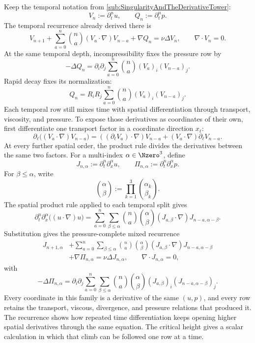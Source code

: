 Keep the temporal notation from \cref{sub:SingularityAndTheDerivativeTower}:
\[
  V_n
  :=
  \partial_t^nu,
  \qquad
  Q_n
  :=
  \partial_t^np.
\]
The temporal recurrence already derived there is
\[
  V_{n+1}
  +
  \sum_{a=0}^{n}
  \binom{n}{a}
  (V_a\cdot\nabla)V_{n-a}
  +\nabla Q_n
  =
  \nu\Delta V_n,
  \qquad
  \nabla\cdot V_n=0.
\]
At the same temporal depth, incompressibility fixes the pressure row by
\[
  -\Delta Q_n
  =
  \partial_i\partial_j
  \sum_{a=0}^{n}
  \binom{n}{a}
  (V_a)_i(V_{n-a})_j.
\]
Rapid decay fixes its normalization:
\[
  Q_n
  =
  R_iR_j
  \sum_{a=0}^{n}
  \binom{n}{a}
  (V_a)_i(V_{n-a})_j.
\]
Each temporal row still mixes time with spatial differentiation through transport, viscosity, and pressure.
To expose those derivatives as coordinates of their own, first differentiate one transport factor in a coordinate direction \(x_\ell\):
\[
  \partial_\ell\bigl((V_a\cdot\nabla)V_{n-a}\bigr)
  =
  ((\partial_\ell V_a)\cdot\nabla)V_{n-a}
  +
  (V_a\cdot\nabla)\partial_\ell V_{n-a}.
\]
At every further spatial order, the product rule divides the derivatives between the same two factors.
For a multi-index \(\alpha\in\Nzero^3\), define
\[
  J_{n,\alpha}
  :=
  \partial_t^n\partial_x^\alpha u,
  \qquad
  \Pi_{n,\alpha}
  :=
  \partial_t^n\partial_x^\alpha p.
\]
For \(\beta\leq\alpha\), write
\[
  \binom{\alpha}{\beta}
  :=
  \prod_{k=1}^{3}
  \binom{\alpha_k}{\beta_k}.
\]
The spatial product rule applied to each temporal split gives
\[
  \partial_t^n\partial_x^\alpha
  \bigl((u\cdot\nabla)u\bigr)
  =
  \sum_{a=0}^{n}
  \sum_{\beta\leq\alpha}
  \binom{n}{a}
  \binom{\alpha}{\beta}
  (J_{a,\beta}\cdot\nabla)
  J_{n-a,\alpha-\beta}.
\]
Substitution gives the pressure-complete mixed recurrence
\begin{align*}
  J_{n+1,\alpha}
  &+
  \sum_{a=0}^{n}
  \sum_{\beta\leq\alpha}
  \binom{n}{a}
  \binom{\alpha}{\beta}
  (J_{a,\beta}\cdot\nabla)
  J_{n-a,\alpha-\beta}
  \\
  &+
  \nabla\Pi_{n,\alpha}
  =
  \nu\Delta J_{n,\alpha},
  \qquad
  \nabla\cdot J_{n,\alpha}=0,
\end{align*}
with
\[
  -\Delta\Pi_{n,\alpha}
  =
  \partial_i\partial_j
  \sum_{a=0}^{n}
  \sum_{\beta\leq\alpha}
  \binom{n}{a}
  \binom{\alpha}{\beta}
  (J_{a,\beta})_i
  (J_{n-a,\alpha-\beta})_j.
\]
Every coordinate in this family is a derivative of the same \((u,p)\), and every row retains the transport, viscous, divergence, and pressure relations that produced it.
The recurrence shows how repeated time differentiation keeps opening higher spatial derivatives through the same equation.
The critical height gives a scalar calculation in which that climb can be followed one row at a time.

